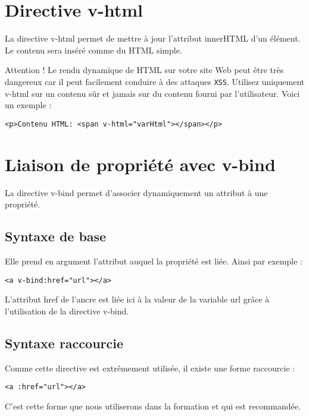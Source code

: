 \section{Directive {\color{monOrange}v-html}}
La directive {\color{monOrange}v-html} permet de mettre à jour l'attribut {\color{monOrange}innerHTML} d'un élément. Le contenu sera inséré comme du HTML simple.

Attention ! Le rendu dynamique de HTML sur votre site Web peut être très dangereux car il peut facilement conduire à des attaques {\tt XSS}. Utilisez uniquement {\color{monOrange}v-html} sur un contenu sûr et jamais sur du contenu fourni par l'utilisateur. Voici un exemple :
\begin{verbatim}
<p>Contenu HTML: <span v-html="varHtml"></span></p>
\end{verbatim}


\section{Liaison de propriété avec v-bind}
La directive v-bind permet d'associer dynamiquement un attribut à une propriété.
\subsection{Syntaxe de base}
Elle prend en argument l'attribut auquel la propriété est liée. Ainsi par exemple :
\begin{verbatim}
<a v-bind:href="url"></a>
\end{verbatim}

L'attribut href de l'ancre est liée ici à la valeur de la variable url grâce à l'utilisation de la directive v-bind.

\subsection{Syntaxe raccourcie}
Comme cette directive est extrêmement utilisée, il existe une forme raccourcie :
\begin{verbatim}
<a :href="url"></a>
\end{verbatim}
C'est cette forme que nous utiliserons dans la formation et qui est recommandée.
